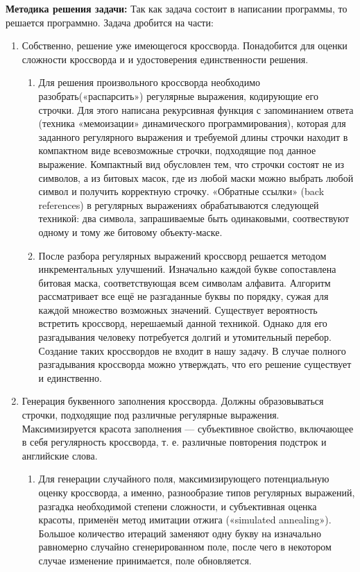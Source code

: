 \documentclass[12pt]{article}
\begin{document}
\textbf{ Методика решения задачи: }
Так как задача состоит в написании программы, то решается программно. Задача дробится на части: 
\begin{enumerate} 
\item Собственно, решение уже имеющегося кроссворда. Понадобится для оценки сложности кроссворда и и удостоверения единственности решения.
\begin{enumerate} 
\item Для решения произвольного кроссворда необходимо разобрать(«распарсить») регулярные выражения, кодирующие его строчки. Для этого написана рекурсивная функция с запоминанием ответа (техника «мемоизации» динамического программирования), которая для заданного регулярного выражения и требуемой длины строчки находит в компактном виде всевозможные строчки, подходящие под данное выражение. Компактный вид обусловлен тем, что строчки состоят не из символов, а из битовых масок, где из любой маски можно выбрать любой символ и получить корректную строчку. «Обратные ссылки» (back references) в регулярных выражениях обрабатываются следующей техникой: два символа, запрашиваемые быть одинаковыми, соотвествуют одному и тому же битовому объекту-маске.
\item После разбора регулярных выражений кроссворд решается методом инкрементальных улучшений. Изначально каждой букве сопоставлена битовая маска, соответствующая всем символам алфавита. Алгоритм рассматривает все ещё не разгаданные буквы по порядку, сужая для каждой множество возможных значений. Существует вероятность встретить кроссворд, нерешаемый данной техникой. Однако для его разгадывания человеку потребуется долгий и утомительный перебор. Создание таких кроссвордов не входит в нашу задачу. В случае полного разгадывания кроссворда можно утверждать, что его решение существует и единственно.
\end{enumerate} 
\item Генерация буквенного заполнения кроссворда. Должны образовываться строчки, подходящие под различные регулярные выражения. Максимизируется красота заполнения — субъективное свойство, включающее в себя регулярность кроссворда, т. е. различные повторения подстрок и английские слова.
\begin{enumerate} 
\item Для генерации случайного поля, максимизирующего потенциальную оценку кроссворда, а именно, разнообразие типов регулярных выражений, разгадка необходимой степени сложности, и субъективная оценка красоты, применён метод имитации отжига («simulated annealing»). Большое количество итераций заменяют одну букву на изначально равномерно случайно сгенерированном поле, после чего в некотором случае изменение принимается, поле обновляется.

\end{enumerate}
\end{enumerate}
\end{document}
